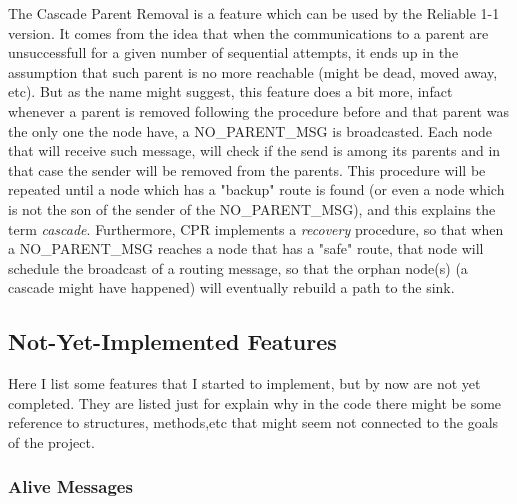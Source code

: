 \documentclass{article}
\begin{document}
The Cascade Parent Removal is a feature which can be used by the Reliable 1-1 version. It comes from the idea that when the communications to a parent are unsuccessfull for a given number of sequential attempts, it ends up in the assumption that such parent is no more reachable (might be dead, moved away, etc). But as the name might suggest, this feature does a bit more, infact whenever a parent is removed following the procedure before and that parent was the only one the node have, a NO\_PARENT\_MSG is broadcasted. Each node that will receive such message, will check if the send is among its parents and in that case the sender will be removed from the parents. This procedure will be repeated until  a node which has a "backup" route is found (or even a node which is not the son of the sender of the NO\_PARENT\_MSG), and this explains the term \textit{cascade}.
Furthermore, CPR implements a \textit{recovery} procedure, so that when a NO\_PARENT\_MSG reaches a node that has a "safe" route, that node will schedule the broadcast of a routing message, so that the orphan node(s) (a cascade might have happened) will eventually rebuild a path to the sink.

	\subsection{Not-Yet-Implemented Features}
Here I list some features that I started to implement, but by now are not yet completed. They are listed just for explain why in the code there might be some reference to structures, methods,etc that might seem not connected to the goals of the project.

		\subsubsection{Alive Messages}
	
\end{document}
